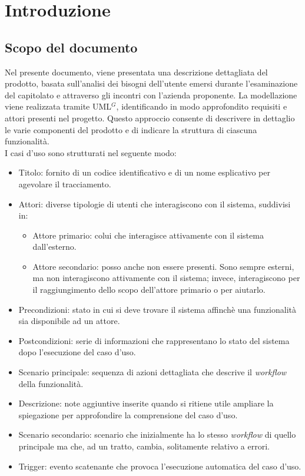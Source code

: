 \section{Introduzione}

\subsection{Scopo del documento}
Nel presente documento, viene presentata una descrizione dettagliata del prodotto, basata sull'analisi dei bisogni dell'utente 
emersi durante l'esaminazione del capitolato e attraverso gli incontri con l'azienda proponente. 
La modellazione viene realizzata tramite UML$^G$, identificando in modo approfondito requisiti e attori presenti nel progetto. 
Questo approccio consente di descrivere in dettaglio le varie componenti del prodotto e di indicare la struttura di ciascuna funzionalità.\\

\noindent
I casi d'uso sono strutturati nel seguente modo:
\begin{itemize}
	\item Titolo: fornito di un codice identificativo e di un nome esplicativo per agevolare il tracciamento.
	\item Attori: diverse tipologie di utenti che interagiscono con il sistema, suddivisi in:
	\begin{itemize}
		\item Attore primario: colui che interagisce attivamente con il sistema dall'esterno.
		\item Attore secondario: posso anche non essere presenti. 
		Sono sempre esterni, ma non interagiscono attivamente con il sistema; invece, interagiscono per il raggiungimento dello scopo dell'attore primario o per aiutarlo.
	\end{itemize}
	\item Precondizioni: stato in cui si deve trovare il sistema affinchè una funzionalità sia disponibile ad un attore.
	\item Postcondizioni: serie di informazioni che rappresentano lo stato del sistema dopo l'esecuzione del caso d'uso.
	\item Scenario principale: sequenza di azioni dettagliata che descrive il \textit{workflow} della funzionalità.
	\item Descrizione: note aggiuntive inserite quando si ritiene utile ampliare la spiegazione per approfondire la comprensione del caso d'uso.
	\item Scenario secondario: scenario che inizialmente ha lo stesso \textit{workflow} di quello principale ma che, ad un tratto, cambia, solitamente relativo a errori.
	\item Trigger: evento scatenante che provoca l'esecuzione automatica del caso d'uso.
\end{itemize}


